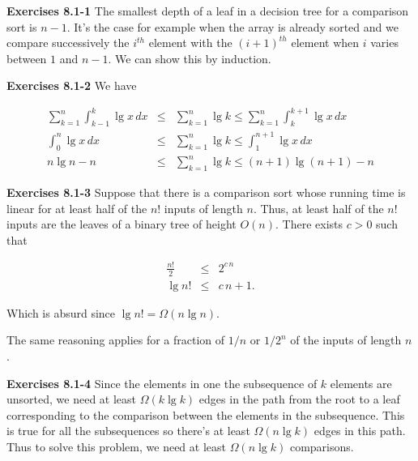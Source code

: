 \documentclass[a4paper,12pt]{article}
\newcommand{\newpar}[1]
{\bigskip \noindent \textbf{Exercises #1} \newline}
\begin{document}
\newpar{8.1-1} The smallest depth of a leaf in a decision tree for a
comparison sort is $n-1$.  It's the case for example when the array is
already sorted and we compare successively the $i^{th}$ element with
the $(i+1)^{th}$ element when $i$ varies between $1$ and $n-1$.  We
can show this by induction.

\newpar{8.1-2} We have

\begin{eqnarray*}
  \sum_{k=1}^n \int_{k-1}^k \lg x\, dx &\le & \sum_{k=1}^n \lg k \le
  \sum_{k=1}^n \int_k^{k+1} \lg x\,dx \\
  \int_0^n \lg x\,dx &\le& \sum_{k=1}^n \lg k \le \int_1^{n+1}\lg
  x\, dx \\
  n\lg n - n &\le& \sum_{k=1}^n \lg k \le (n+1)\lg(n+1) - n
\end{eqnarray*}

\newpar{8.1-3}  Suppose that there is a comparison sort whose running
time is linear for at least half of the $n!$ inputs of length $n$.
Thus, at least half of the $n!$ inputs are the leaves of a binary tree
of height $O(n)$.  There exists $c > 0$ such that

\begin{eqnarray*}
  \frac{n!}{2} &\le& 2^{c\,n} \\
  \lg n! &\le& c\,n + 1.
\end{eqnarray*}

Which is absurd since $\lg n! = \Omega(n\lg n)$.

\medskip
The same reasoning applies for a fraction of $1/n$ or $1/2^n$ of the
inputs of length $n$.

\newpar{8.1-4}
Since the elements in one the subsequence of $k$ elements are
unsorted, we need at least $\Omega(k\lg k)$ edges in the path from the
root to a leaf corresponding to the comparison between the elements in
the subsequence.  This is true for all the subsequences so there's at
least $\Omega(n\lg k)$ edges in this path.  Thus to solve this problem, we
need at least $\Omega(n\lg k)$ comparisons.
\end{document}
